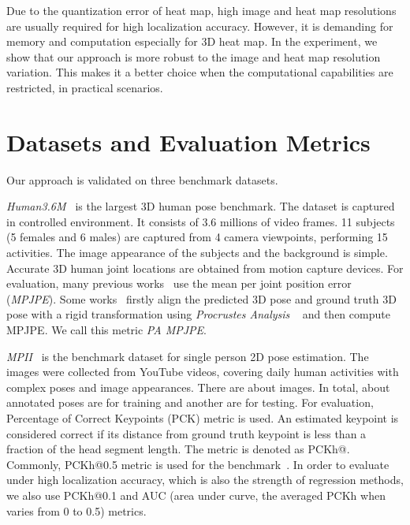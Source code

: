 \documentclass[runningheads]{llncs}
\begin{document}
Due to the quantization error of heat map, high image and heat map resolutions are usually required for high localization accuracy. However, it is demanding for memory and computation especially for 3D heat map. In the experiment, we show that our approach is more robust to the image and heat map resolution variation. This makes it a better choice when the computational capabilities are restricted, in practical scenarios.

\section{Datasets and Evaluation Metrics}
\label{sec.dataset}

Our approach is validated on three benchmark datasets.

\emph{Human3.6M~\cite{ionescu2014human3}} is the largest 3D human pose benchmark. The dataset is captured in controlled environment. It consists of 3.6 millions of video frames. 11 subjects (5 females and 6 males) are captured from 4 camera viewpoints, performing 15 activities. The image appearance of the subjects and the background is simple. Accurate 3D human joint locations are obtained from motion capture devices. For evaluation, many previous works~\cite{chen20163d,tome2017lifting,moreno20163d,zhou2017monocap,jahangiri2017generating,mehta2016monocular,pavlakos2016coarse,yasin2016dual,rogez2016mocap,bogo2016keep,zhou2016sparseness,tekin2016direct,zhou2016deep} use the mean per joint position error (\emph{MPJPE}). Some works~\cite{yasin2016dual,rogez2016mocap,chen20163d,bogo2016keep,moreno20163d,zhou2017monocap} firstly align the predicted 3D pose and ground truth 3D pose with a rigid transformation using \emph{Procrustes Analysis} ~\cite{gower1975generalized} and then compute MPJPE. We call this metric \emph{PA MPJPE}.

\emph{MPII~\cite{andriluka20142d}} is the benchmark dataset for single person 2D pose estimation. The images were collected from YouTube videos, covering daily human activities with complex poses and image appearances. There are about  images. In total, about  annotated poses are for training and another  are for testing. For evaluation, Percentage of Correct Keypoints (PCK) metric is used. An estimated keypoint is considered correct if its distance from ground truth keypoint is less than a fraction  of the head segment length. The metric is denoted as PCKh@. Commonly, PCKh@0.5 metric is used for the benchmark~\cite{mpiiwebpage}. In order to evaluate under high localization accuracy, which is also the strength of regression methods, we also use PCKh@0.1 and AUC (area under curve, the averaged PCKh when  varies from 0 to 0.5) metrics.
\end{document}

